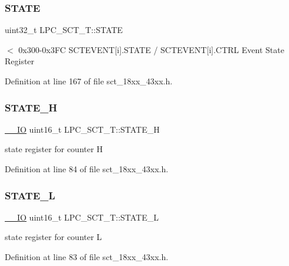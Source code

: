 \subsubsection{\texorpdfstring{S\+T\+A\+TE}{STATE}}
{\footnotesize\ttfamily uint32\+\_\+t L\+P\+C\+\_\+\+S\+C\+T\+\_\+\+T\+::\+S\+T\+A\+TE}

$<$ 0x300-\/0x3\+FC S\+C\+T\+E\+V\+E\+NT\mbox{[}i\mbox{]}.S\+T\+A\+TE / S\+C\+T\+E\+V\+E\+NT\mbox{[}i\mbox{]}.C\+T\+RL Event State Register 

Definition at line 167 of file sct\+\_\+18xx\+\_\+43xx.\+h.

\mbox{\label{struct_l_p_c___s_c_t___t_aa366ac861a5b1fe7fabb9971deb2ec14}} 
\subsubsection{\texorpdfstring{S\+T\+A\+T\+E\+\_\+H}{STATE\_H}}
{\footnotesize\ttfamily \hyperlink{core__sc300_8h_aec43007d9998a0a0e01faede4133d6be}{\+\_\+\+\_\+\+IO} uint16\+\_\+t L\+P\+C\+\_\+\+S\+C\+T\+\_\+\+T\+::\+S\+T\+A\+T\+E\+\_\+H}

state register for counter H 

Definition at line 84 of file sct\+\_\+18xx\+\_\+43xx.\+h.

\mbox{\label{struct_l_p_c___s_c_t___t_a8e994af28725589a064e85e37bd30174}} 
\subsubsection{\texorpdfstring{S\+T\+A\+T\+E\+\_\+L}{STATE\_L}}
{\footnotesize\ttfamily \hyperlink{core__sc300_8h_aec43007d9998a0a0e01faede4133d6be}{\+\_\+\+\_\+\+IO} uint16\+\_\+t L\+P\+C\+\_\+\+S\+C\+T\+\_\+\+T\+::\+S\+T\+A\+T\+E\+\_\+L}

state register for counter L 

Definition at line 83 of file sct\+\_\+18xx\+\_\+43xx.\+h.

\mbox{\label{struct_l_p_c___s_c_t___t_a0237fab449bff371dc755be6e961b452}} 
